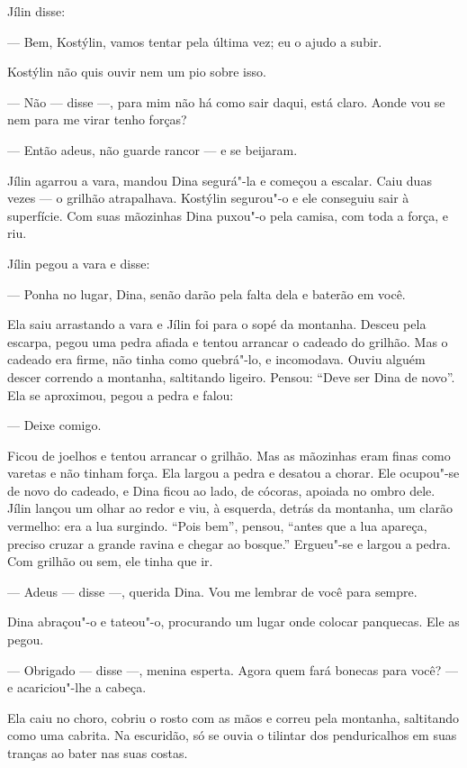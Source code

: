 Jílin disse:

--- Bem, Kostýlin, vamos tentar pela última vez; eu o ajudo a subir.

Kostýlin não quis ouvir nem um pio sobre isso.

--- Não --- disse ---, para mim não há como sair daqui, está claro. Aonde vou se nem para me virar tenho forças?

--- Então adeus, não guarde rancor --- e se beijaram.

Jílin agarrou a vara, mandou Dina segurá"-la e começou a escalar. Caiu
duas vezes --- o grilhão atrapalhava. Kostýlin segurou"-o e ele conseguiu
sair à superfície. Com suas mãozinhas Dina puxou"-o pela camisa, com toda
a força, e riu.

Jílin pegou a vara e disse:

--- Ponha no lugar, Dina, senão darão pela falta dela e baterão em você.

Ela saiu arrastando a vara e Jílin foi para o sopé da montanha. Desceu
pela escarpa, pegou uma pedra afiada e tentou arrancar o cadeado do
grilhão. Mas o cadeado era firme, não tinha como quebrá"-lo, e
incomodava. Ouviu alguém descer correndo a montanha, saltitando ligeiro.
Pensou: ``Deve ser Dina de novo''. Ela se aproximou, pegou a pedra e
falou:

--- Deixe comigo.

Ficou de joelhos e tentou arrancar o grilhão. Mas as mãozinhas eram
finas como varetas e não tinham força. Ela largou a pedra e desatou a
chorar. Ele ocupou"-se de novo do cadeado, e Dina ficou ao lado, de
cócoras, apoiada no ombro dele. Jílin lançou um olhar ao redor e viu, à
esquerda, detrás da montanha, um clarão vermelho: era a lua surgindo.
``Pois bem'', pensou, ``antes que a lua apareça, preciso cruzar a grande
ravina e chegar ao bosque.'' Ergueu"-se e largou a pedra. Com grilhão ou
sem, ele tinha que ir.

--- Adeus --- disse ---, querida Dina. Vou me lembrar de você para
sempre.

Dina abraçou"-o e tateou"-o, procurando um lugar onde colocar panquecas.
Ele as pegou.

--- Obrigado --- disse ---, menina esperta. Agora quem fará bonecas para
você? --- e acariciou"-lhe a cabeça.

Ela caiu no choro, cobriu o rosto com as mãos e correu pela montanha,
saltitando como uma cabrita. Na escuridão, só se ouvia o tilintar dos
penduricalhos em suas tranças ao bater nas suas costas.

